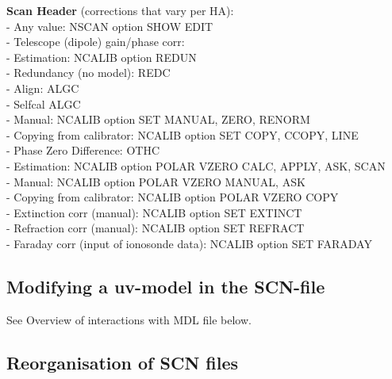 {\bf Scan Header} (corrections that vary per HA):\\ 
- Any value: NSCAN option SHOW EDIT\\ 
- Telescope (dipole) gain/phase corr:\\ 
\hspace*{5mm} - Estimation: NCALIB option REDUN \\ 
\hspace*{10mm} - Redundancy (no model): REDC\\ 
\hspace*{10mm} - Align: ALGC\\ 
\hspace*{10mm} - Selfcal ALGC\\ 
\hspace*{5mm} - Manual: NCALIB option SET MANUAL, ZERO, RENORM \\ 
\hspace*{5mm} - Copying from calibrator: NCALIB option SET COPY, CCOPY, LINE\\ 
- Phase Zero Difference: OTHC\\ 
\hspace*{5mm} - Estimation: NCALIB option POLAR VZERO CALC, APPLY, ASK, SCAN \\ 
\hspace*{5mm} - Manual: NCALIB option POLAR VZERO MANUAL, ASK\\ 
\hspace*{5mm} - Copying from calibrator: NCALIB option POLAR VZERO COPY\\ 
- Extinction corr (manual): NCALIB option SET EXTINCT\\ 
- Refraction corr (manual): NCALIB option SET REFRACT\\ 
- Faraday corr (input of ionosonde data): NCALIB option SET FARADAY\\ 


\subsection{Modifying a uv-model in the SCN-file} 
\label{scn.uvmodel} 

	See Overview of interactions with MDL file below. 


\subsection{Reorganisation of SCN files} 
\label{scn.reorg} 

